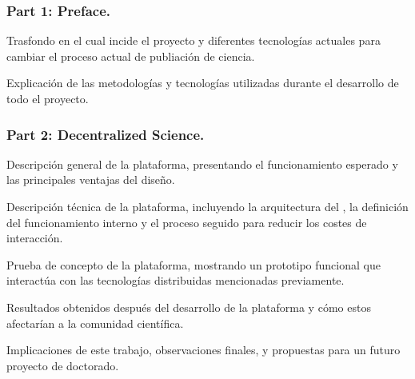 \subsubsection*{Part 1: Preface.}
\begin{itemize}
   Trasfondo en
  el cual incide el proyecto y diferentes tecnologías actuales para
  cambiar el proceso actual de publiación de ciencia.

   Explicación de  las
  metodologías y tecnologías utilizadas durante el desarrollo de todo el
  proyecto.
  
\end{itemize}
\subsubsection*{Part 2: Decentralized Science.}
\begin{itemize}
   Descripción general de la plataforma, presentando
  el funcionamiento esperado y las principales ventajas del diseño.
  
   Descripción técnica de la plataforma, incluyendo la
  arquitectura del , la definición del funcionamiento interno y el
  proceso seguido para reducir los costes de interacción.
  
   Prueba de concepto de la plataforma, mostrando un prototipo
  funcional que interactúa con las tecnologías distribuidas mencionadas previamente.

   Resultados obtenidos después del desarrollo de la
  plataforma y cómo estos afectarían a la comunidad científica.

   Implicaciones de este trabajo,
  observaciones finales, y propuestas para un futuro proyecto de doctorado.
\end{itemize}

